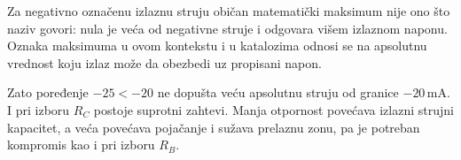 Za negativno označenu izlaznu struju običan matematički maksimum nije ono što naziv govori: nula je veća od negativne struje i odgovara višem izlaznom naponu. Oznaka maksimuma u ovom kontekstu i u katalozima odnosi se na apsolutnu vrednost koju izlaz može da obezbedi uz propisani napon.

Zato poređenje $-25<-20$ ne dopušta veću apsolutnu struju od granice $-20\,\mathrm{mA}$. I pri izboru $R_C$ postoje suprotni zahtevi. Manja otpornost povećava izlazni strujni kapacitet, a veća povećava pojačanje i sužava prelaznu zonu, pa je potreban kompromis kao i pri izboru $R_B$.
